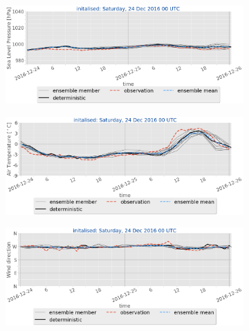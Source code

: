 \begin{figure}\ContinuedFloat
	\centering
	\begin{subfigure}[b]{0.49\textwidth}
		\includegraphics[trim={0.cm 5.cm 0cm 0cm},clip,
		width=\textwidth]{./fig_sfc_pressure/20161224_00}
		\caption{}\label{fig:res:sfc_pres24}
	\end{subfigure}
	
	\begin{subfigure}[b]{0.49\textwidth}
		\includegraphics[trim={0.cm 5.cm 0cm 0cm},clip,
		width=\textwidth]{./fig_sfc_temp/20161224_00}
		\caption{}\label{fig:res:sfc_temp24}
	\end{subfigure}
	
	\begin{subfigure}[b]{0.49\textwidth}
		\includegraphics[trim={0.cm 5.cm 0cm 0cm},clip,
		width=\textwidth]{./fig_sfc_wd/20161224_00}
		\caption{}\label{fig:res:sfc_wd24}
	\end{subfigure}
	

\end{figure}

